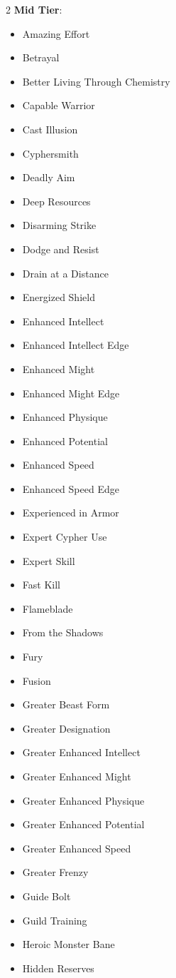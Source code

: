 \begin{multicols}{2}
\textbf{Mid Tier}:

\begin{itemize}
\item Amazing Effort
\item Betrayal
\item Better Living Through Chemistry
\item Capable Warrior
\item Cast Illusion
\item Cyphersmith
\item Deadly Aim
\item Deep Resources
\item Disarming Strike
\item Dodge and Resist
\item Drain at a Distance
\item Energized Shield
\item Enhanced Intellect
\item Enhanced Intellect Edge
\item Enhanced Might
\item Enhanced Might Edge
\item Enhanced Physique
\item Enhanced Potential
\item Enhanced Speed
\item Enhanced Speed Edge
\item Experienced in Armor
\item Expert Cypher Use
\item Expert Skill
\item Fast Kill
\item Flameblade
\item From the Shadows
\item Fury
\item Fusion
\item Greater Beast Form
\item Greater Designation
\item Greater Enhanced Intellect
\item Greater Enhanced Might
\item Greater Enhanced Physique
\item Greater Enhanced Potential
\item Greater Enhanced Speed
\item Greater Frenzy
\item Guide Bolt
\item Guild Training
\item Heroic Monster Bane
\item Hidden Reserves

\end{itemize}
\end{multicols}
